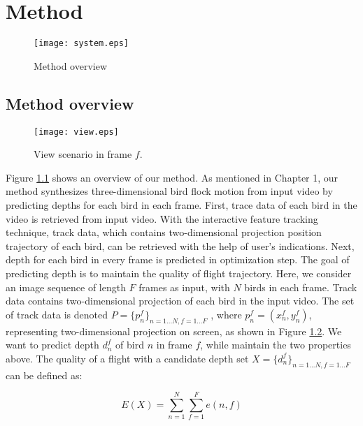 \chapter{Method}


\begin{figure}[h]
 \begin{center}
  \texttt{[image: system.eps]}
 \end{center}
 \caption{Method overview}
 \label{figure:system}
\end{figure}


\section{Method overview}


\begin{figure}[h]
 \begin{center}
  \texttt{[image: view.eps]}
 \end{center}
 \caption{View scenario in frame $f$.}
 \label{figure:view}
\end{figure}


Figure \ref{figure:system}  shows an overview of our method. As mentioned in Chapter 1, our method synthesizes three-dimensional bird flock motion from input video by predicting depths for each bird in each frame. First, trace data of each bird in the video is retrieved from input video. With the interactive feature tracking technique, track data, which contains two-dimensional projection position trajectory of each bird, can be retrieved with the help of user's indications. Next, depth for each bird in every frame is predicted in optimization step. The goal of predicting depth is to maintain the quality of flight trajectory. Here, we consider an image sequence of length $F$ frames as input, with $N$ birds in each frame. Track data contains two-dimensional projection of each bird in the input video. The set of track data is denoted $P=\big\{p_n^f\big\}_{n=1...N,f=1...F}$ , where $p_n^f=(x_n^f, y_n^f)$, representing two-dimensional projection on screen, as shown in Figure \ref{figure:view}. We want to predict depth $d_n^f$ of bird $n$ in frame $f$, while maintain the two properties above. The quality of a flight with a candidate depth set $X=\big\{d_n^f\big\}_{n=1...N,f=1...F}$ can be defined as:


\begin{equation}\label{eq:1}
 E(X) = \sum_{n = 1}^{N} \sum_{f = 1}^{F}e(n,f)
\end{equation}


